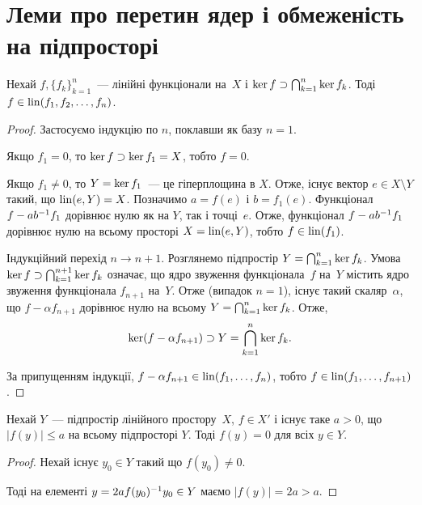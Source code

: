 \section{Леми про перетин ядер і обмеженість на підпросторі}

\begin{lemma}
    \label{lem:kernel-intersection-supset-linear-combination}
    Нехай $f, \{f_k\}_{k = 1}^n$~--- лінійні функціонали на~$X$ і $\operatorname{ker} f \supset \bigcap_{k = 1}^n \operatorname{ker} f_k$. Тоді $f \in \operatorname{lin}(f_1, f_2, \dots, f_n)$.
\end{lemma}

\begin{proof}
    Застосуємо індукцію по $n$, поклавши як базу $n = 1$.

    Якщо $f_1 = 0$, то $\operatorname{ker} f \supset \operatorname{ker} f_1 = X$, тобто $f = 0$.

    Якщо $f_1 \ne 0$, то $Y = \operatorname{ker} f_1$~--- це гіперплощина в $X$. Отже, існує вектор $e \in X \setminus Y$ такий, що $\operatorname{lin}(e, Y) = X$. Позначимо $a = f(e)$ і $b = f_1(e)$. Функціонал $f - ab^{-1} f_1$ дорівнює нулю як на $Y$, так і точці~$e$. Отже, функціонал $f - ab^{-1} f_1$ дорівнює нулю на всьому просторі $X = \operatorname{lin}(e, Y)$, тобто $f \in \operatorname{lin}(f_1)$.

    Індукційний перехід $n \to n + 1$. Розглянемо підпростір $Y = \bigcap_{k = 1}^n \operatorname{ker} f_k$. Умова $\operatorname{ker} f \supset \bigcap_{k = 1}^{n + 1} \operatorname{ker} f_k$ означає, що ядро звуження функціонала~$f$ на~$Y$ містить ядро звуження функціонала $f_{n + 1}$ на~$Y$. Отже (випадок $n = 1$), існує такий скаляр~$\alpha$, що $f - \alpha f_{n + 1}$ дорівнює нулю на всьому $Y = \bigcap_{k = 1}^n \operatorname{ker} f_k$. Отже,
    \begin{equation*}
        \operatorname{ker} (f - \alpha f_{n + 1}) \supset Y = \bigcap_{k = 1}^n \operatorname{ker} f_k.
    \end{equation*}

    За припущенням індукції, $f - \alpha f_{n + 1} \in \operatorname{lin}(f_1, \dots, f_n)$, тобто $f \in \operatorname{lin}(f_1, \dots, f_{n + 1})$.
\end{proof}

\begin{lemma}
    \label{lem:linear-subspace-bounded-implies-zero}
    Нехай $Y$~--- підпростір лінійного простору~$X$, $f \in X'$ і існує таке $a > 0$, що $|f(y)| \le a$ на всьому підпросторі $Y$. Тоді $f(y) = 0$ для всіх $y \in Y$.
\end{lemma}

\begin{proof}
    Нехай існує $y_0 \in Y$ такий що $f(y_0) \ne 0$.
    
    Тоді на елементі $y = 2 a f(y_0)^{-1} y_0 \in Y$ маємо $|f(y)| = 2 a > a$.
\end{proof}

